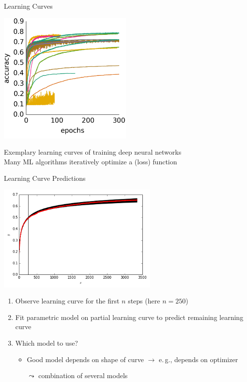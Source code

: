 \begin{frame}[c,fragile]{Learning Curves}

\centering
\includegraphics[width=0.5\textwidth]{images/learning_curves}

Exemplary learning curves of training deep neural networks\\
Many ML algorithms iteratively optimize a (loss) function

\end{frame}

\begin{frame}[c,fragile]{Learning Curve Predictions}

\centering
\includegraphics[width=0.6\textwidth]{images/learning_curve_single_pred}

\begin{enumerate}
  \item Observe learning curve for the first $n$ steps (here $n=250$)
  \pause
  \item Fit parametric model on partial learning curve to predict remaining learning curve
  \pause
  \item Which model to use? 
  \begin{itemize}
    \item Good model depends on shape of curve $\to$ e.$\,$g., depends on optimizer  
    \item[$\leadsto$] combination of several models
  \end{itemize}
  
\end{enumerate}

\end{frame}

